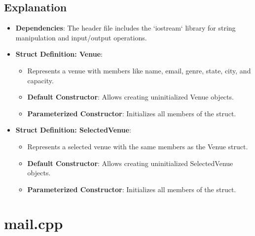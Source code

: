 \documentclass{article}
\begin{document}
	\subsection*{Explanation}
	\begin{itemize}
		\item \textbf{Dependencies}: The header file includes the `iostream` library for string manipulation and input/output operations.
		\item \textbf{Struct Definition: Venue}:
		\begin{itemize}
			\item Represents a venue with members like name, email, genre, state, city, and capacity.
			\item \textbf{Default Constructor}: Allows creating uninitialized Venue objects.
			\item \textbf{Parameterized Constructor}: Initializes all members of the struct.
		\end{itemize}
		\item \textbf{Struct Definition: SelectedVenue}:
		\begin{itemize}
			\item Represents a selected venue with the same members as the Venue struct.
			\item \textbf{Default Constructor}: Allows creating uninitialized SelectedVenue objects.
			\item \textbf{Parameterized Constructor}: Initializes all members of the struct.
		\end{itemize}
	\end{itemize}
	
	\section{mail.cpp}
	
\end{document}
